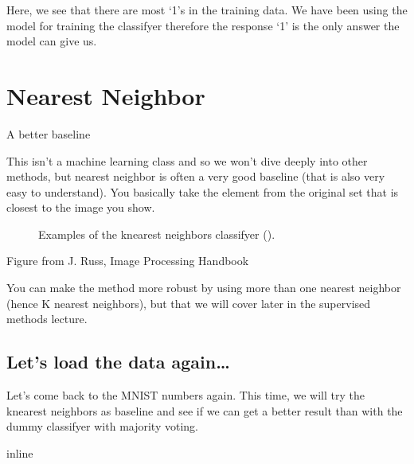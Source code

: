 \documentclass[letterpaper,10pt,english]{sphinxmanual}
\begin{document}
\noindent{}

\sphinxAtStartPar
Here, we see that there are most ‘1’s in the training data. We have been using the  model for training the classifyer therefore the response ‘1’ is the only answer the model can give us.


\section{Nearest Neighbor}
\label{\detokenize{03-Datasets:nearest-neighbor}}
\sphinxAtStartPar
A better baseline

\sphinxAtStartPar
This isn’t a machine learning class and so we won’t dive deeply into other methods, but nearest neighbor is often a very good baseline (that is also very easy to understand). You basically take the element from the original set that is closest to the image you show.

\begin{figure}[htbp]
\centering
\capstart

\noindent{}
\caption{Examples of the k\sphinxhyphen{}nearest neighbors classifyer ().}\label{\detokenize{03-Datasets:id22}}\end{figure}



\sphinxAtStartPar
Figure from J. Russ, Image Processing Handbook

\sphinxAtStartPar
You can make the method more robust by using more than one nearest neighbor (hence K nearest neighbors), but that we will cover later in the supervised methods lecture.


\subsection{Let’s load the data again…}
\label{\detokenize{03-Datasets:let-s-load-the-data-again}}
\sphinxAtStartPar
Let’s come back to the MNIST numbers again. This time, we will try the k\sphinxhyphen{}nearest neighbors as baseline and see if we can get a better result than with the dummy classifyer with majority voting.

\begin{sphinxVerbatim}[commandchars=\\\{\}]
   
   
   
     
 inline
\end{sphinxVerbatim}
\end{document}
